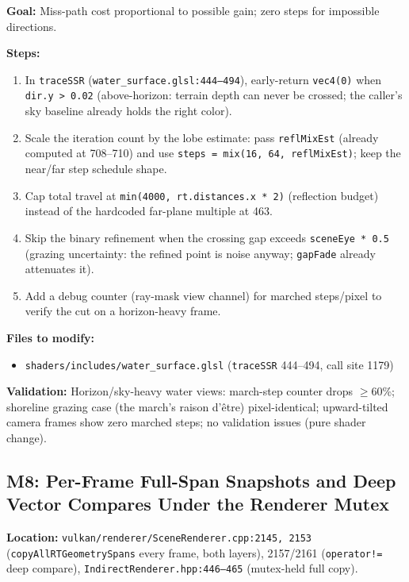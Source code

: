 \documentclass[11pt,a4paper]{article}
\begin{document}
\begin{tcolorbox}[promptbox={Prompt: Gate and Adapt the Miss-Path SSR March}]
\textbf{Goal:} Miss-path cost proportional to possible gain; zero steps for impossible directions.

\textbf{Steps:}
\begin{enumerate}
    \item In \texttt{traceSSR} (\texttt{water\_surface.glsl:444--494}), early-return \texttt{vec4(0)} when \texttt{dir.y > 0.02} (above-horizon: terrain depth can never be crossed; the caller's sky baseline already holds the right color).
    \item Scale the iteration count by the lobe estimate: pass \texttt{reflMixEst} (already computed at 708--710) and use \texttt{steps = mix(16, 64, reflMixEst)}; keep the near/far step schedule shape.
    \item Cap total travel at \texttt{min(4000, rt.distances.x * 2)} (reflection budget) instead of the hardcoded far-plane multiple at 463.
    \item Skip the binary refinement when the crossing gap exceeds \texttt{sceneEye * 0.5} (grazing uncertainty: the refined point is noise anyway; \texttt{gapFade} already attenuates it).
    \item Add a debug counter (ray-mask view channel) for marched steps/pixel to verify the cut on a horizon-heavy frame.
\end{enumerate}

\textbf{Files to modify:}
\begin{itemize}
    \item \texttt{shaders/includes/water\_surface.glsl} (\texttt{traceSSR} 444--494, call site 1179)
\end{itemize}

\textbf{Validation:} Horizon/sky-heavy water views: march-step counter drops $\geq$60\%; shoreline grazing case (the march's raison d'\^{e}tre) pixel-identical; upward-tilted camera frames show zero marched steps; no validation issues (pure shader change).
\end{tcolorbox}

\subsection{M8: Per-Frame Full-Span Snapshots and Deep Vector Compares Under the Renderer Mutex}

\textbf{Location:} \texttt{vulkan/renderer/SceneRenderer.cpp:2145, 2153} (\texttt{copyAllRTGeometrySpans} every frame, both layers), 2157/2161 (\texttt{operator!=} deep compare), \texttt{IndirectRenderer.hpp:446--465} (mutex-held full copy).
\end{document}
